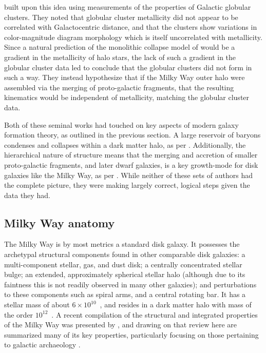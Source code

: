 \textcite{searle78} built upon this idea using measurements of the properties of Galactic globular clusters. They noted that globular cluster metallicity did not appear to be correlated with Galactocentric distance, and that the clusters show variations in color-magnitude diagram morphology which is itself uncorrelated with metallicity. Since a natural prediction of the monolithic collapse model of \textcite{eggen62} would be a gradient in the metallicity of halo stars, the lack of such a gradient in the globular cluster data led \textcite{searle78} to conclude that the globular clusters did not form in such a way. They instead hypothesize that if the Milky Way outer halo were assembled via the merging of proto-galactic fragments, that the resulting kinematics would be independent of metallicity, matching the globular cluster data.

Both of these seminal works had touched on key aspects of modern galaxy formation theory, as outlined in the previous section. A large reservoir of baryons condenses and collapses within a dark matter halo, as per \textcite{eggen62}. Additionally, the hierarchical nature of structure means that the merging and accretion of smaller proto-galactic fragments, and later dwarf galaxies, is a key growth-mode for disk galaxies like the Milky Way, as per \textcite{searle78}. While neither of these sets of authors had the complete picture, they were making largely correct, logical steps given the data they had.

\subsection{Milky Way anatomy}

The Milky Way is by most metrics a standard disk galaxy. It possesses the archetypal structural components found in other comparable disk galaxies: a multi-component stellar, gas, and dust disk; a centrally concentrated stellar bulge; an extended, approximately spherical stellar halo (although due to its faintness this is not readily observed in many other galaxies); and perturbations to these components such as spiral arms, and a central rotating bar. It has a stellar mass of about $6\times10^{10}$~\Msun, and resides in a dark matter halo with mass of the order $10^{12}$~\Msun.  A recent compilation of the structural and integrated properties of the Milky Way was presented by \textcite{bland-hawthorn16}, and drawing on that review here are summarized many of its key properties, particularly focusing on those pertaining to galactic archaeology \parencite[see also][]{ivezic12}.

